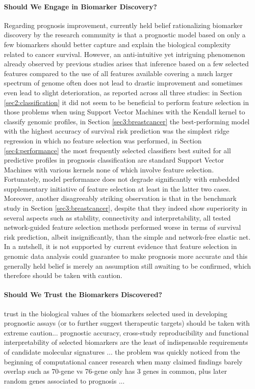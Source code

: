 \paragraph{Should We Engage in Biomarker Discovery?} Regarding prognosis improvement, currently held belief rationalizing biomarker discovery by the research community is that a prognostic model based on only a few biomarkers should better capture and explain the biological complexity related to cancer survival. However, an anti-intuitive yet intriguing phenomenon already observed by previous studies \cite{Haury2011influence} arises that inference based on a few selected features compared to the use of all features available covering a much larger spectrum of genome often does not lead to drastic improvement and sometimes even lead to slight deterioration, as reported across all three studies: in Section \ref{sec2:classification} it did not seem to be beneficial to perform feature selection in those problems when using Support Vector Machines with the Kendall kernel to classify genomic profiles, in Section \ref{sec3:breastcancer} the best-performing model with the highest accuracy of survival risk prediction was the simplest ridge regression in which no feature selection was performed, in Section \ref{sec4:performance} the most frequently selected classifiers best suited for all predictive profiles in prognosis classification are standard Support Vector Machines with various kernels none of which involve feature selection. Fortunately, model performance does not degrade significantly with embedded supplementary initiative of feature selection at least in the latter two cases. Moreover, another disagreeably striking observation is that in the benchmark study in Section \ref{sec3:breastcancer}, despite that they indeed show superiority in several aspects such as stability, connectivity and interpretability, all tested network-guided feature selection methods performed worse in terms of survival risk prediction, albeit insignificantly, than the simple and network-free elastic net. In a nutshell, it is not supported by current evidence that feature selection in genomic data analysis could guarantee to make prognosis more accurate and this generally held belief is merely an assumption still awaiting to be confirmed, which therefore should be taken with caution.


\paragraph{Should We Trust the Biomarkers Discovered?} trust in the biological values of the biomarkers selected used in developing prognostic assays (or to further suggest therapeutic targets) should be taken with extreme caution... prognostic accuracy, cross-study reproducibility and functional interpretability of selected biomarkers are the least of indispensable requirements of candidate molecular signatures \cite{Haury2011influence}... the problem was quickly noticed from the beginning of computational cancer research when many claimed findings barely overlap such as 70-gene vs 76-gene only has 3 genes in common, plus later random genes associated to prognosis \cite{Venet2011Most}...


